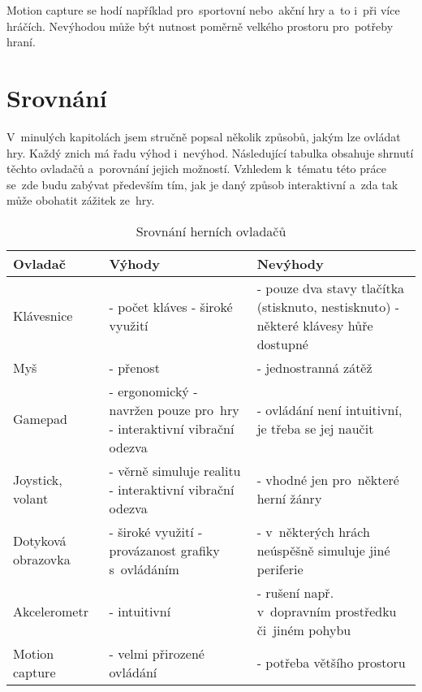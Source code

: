 \documentclass[thesis=B,czech,hidelinks]{FITthesis}[2012/06/26] %
\begin{document}
Motion capture se hodí například pro~sportovní nebo~akční hry a~to i~při více hráčích. Nevýhodou může být nutnost poměrně velkého prostoru pro~potřeby hraní.

\section{Srovnání}

V~minulých kapitolách jsem stručně popsal několik způsobů, jakým lze ovládat hry. Každý znich má řadu výhod i~nevýhod. Následující tabulka obsahuje shrnutí těchto ovladačů a~porovnání jejich možností. Vzhledem k~tématu této práce se~zde budu zabývat především tím, jak je daný způsob interaktivní a~zda tak může obohatit zážitek ze~hry.

\begin{table}[h]
\caption{Srovnání herních ovladačů}
\begin{tabularx}{\textwidth}{|l|X|X|}
\hline
\textbf{Ovladač} & \textbf{Výhody} & \textbf{Nevýhody} \\ \hline
Klávesnice & - počet kláves \newline - široké využití & - pouze dva stavy tlačítka (stisknuto, nestisknuto) \newline - některé klávesy hůře dostupné \\ \hline
Myš & - přenost & - jednostranná zátěž \\ \hline
Gamepad & - ergonomický \newline - navržen pouze pro~hry \newline - interaktivní vibrační odezva & - ovládání není intuitivní, je třeba se jej naučit \\ \hline
Joystick, volant & - věrně simuluje realitu \newline - interaktivní vibrační odezva & - vhodné jen pro~některé herní žánry \\ \hline
Dotyková obrazovka & - široké využití \newline - provázanost grafiky s~ovládáním & - v~některých hrách neúspěšně simuluje jiné periferie \\ \hline
Akcelerometr & - intuitivní & - rušení např. v~dopravním prostředku či~jiném pohybu \\ \hline
Motion capture & - velmi přirozené ovládání & - potřeba většího prostoru \\ \hline

\end{tabularx}
\end{table}
\end{document}
